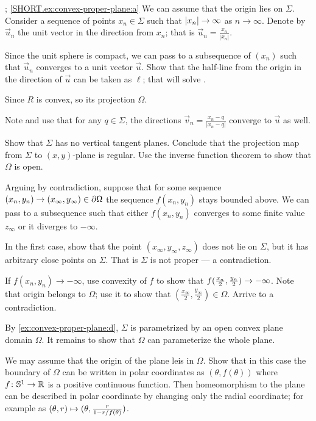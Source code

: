 \parbf{\ref{ex:convex-proper-plane}}; \ref{SHORT.ex:convex-proper-plane:a}
We can assume that the origin lies on $\Sigma$.
Consider a sequence of points $x_n\in \Sigma$ such that $|x_n|\z\to \infty$ as $n\to \infty$.
Denote by $\vec u_n$ the unit vector in the direction from $x_n$; that is $\vec u_n=\tfrac{x_n}{|x_n|}$.

Since the unit sphere is compact, we can pass to a subsequence of $(x_n)$ such that $\vec u_n$ converges to a unit vector $\vec u$.
Show that the half-line from the origin in the direction of $\vec u$ can be taken as $\ell$; that will solve .


Since $R$ is convex, so its projection $\Omega$.

Note and use that for any $q\in \Sigma$, the directions $\vec v_n=\tfrac{x_n-q}{|x_n-q|}$ converge to $\vec u$ as well.

Show that $\Sigma$ has no vertical tangent planes.
Conclude that the projection map from $\Sigma$ to $(x,y)$-plane is regular.
Use the inverse function theorem to show that $\Omega$ is open.

Arguing by contradiction, suppose that for some sequence $(x_n,y_n)\z\to(x_\infty,y_\infty)\in \partial\Omega$ the sequence $f(x_n,y_n)$ stays bounded above.
We can pass to a subsequence such that either $f(x_n,y_n)$ converges to some finite value $z_\infty$ or it diverges to $-\infty$.

In the first case, show that the point $(x_\infty, y_\infty,z_\infty)$ does not lie on $\Sigma$, but it has arbitrary close points on $\Sigma$.
That is $\Sigma$ is not proper --- a contradiction.

If $f(x_n,y_n)\to -\infty$, use convexity of $f$ to show that $f(\tfrac{x_n}2 ,\tfrac{y_n}2)\z\to -\infty$.
Note that origin belongs to $\Omega$;
use it to show that $(\tfrac{x_\infty}2, \tfrac{y_\infty}2)\in\Omega$.
Arrive to a contradiction.

By \ref{ex:convex-proper-plane:d}, $\Sigma$ is parametrized by an open convex plane domain $\Omega$.
It remains to show that $\Omega$ can parameterize the whole plane.

We may assume that the origin of the plane leis in $\Omega$.
Show that in this case the boundary of $\Omega$ can be written in polar coordinates as $(\theta,f(\theta))$ where $f\colon\mathbb{S}^1\to\mathbb{R}$ is a positive continuous function.
Then homeomorphism to the plane can be described in polar coordinate by changing only the radial coordinate;
for example as 
$(\theta,r)\z\mapsto (\theta,
\tfrac{r}{1-r/f(\theta)})$.

